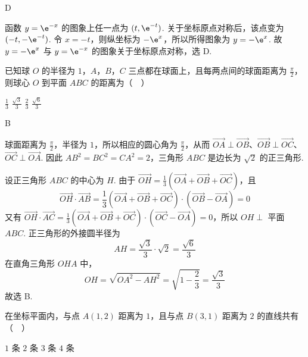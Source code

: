 \begin{answer}
D
\end{answer}

\begin{solution}
函数 \(y=\e^{-x}\) 的图象上任一点为 \((t,\e^{-t})\). 关于坐标原点对称后，该点变为 \((-t,-\e^{-t})\). 令 \(x=-t\)，则纵坐标为 \(-\e^x\)，所以所得图象为 \(y=-\e^x\). 故 \(y=-\e^x\) 与 \(y=\e^{-x}\) 的图象关于坐标原点对称，选 D.
\end{solution}

\begin{problem}
已知球 \(O\) 的半径为 \(1\)，\(A\)，\(B\)，\(C\) 三点都在球面上，且每两点间的球面距离为 \(\frac{\pi}{2}\)，则球心 \(O\) 到平面 \(ABC\) 的距离为（\(\quad\)）

\choices
    {\(\frac{1}{3}\)}
    {\(\frac{\sqrt{3}}{3}\)}
    {\(\frac{2}{3}\)}
    {\(\frac{\sqrt{6}}{3}\)}
\end{problem}

\begin{answer}
B
\end{answer}

\begin{solution}
球面距离为 \(\frac\pi2\)，半径为 \(1\)，所以相应的圆心角为 \(\frac\pi2\)，从而
\(\overrightarrow{OA}\perp\overrightarrow{OB}\)、\(\overrightarrow{OB}\perp\overrightarrow{OC}\)、\(\overrightarrow{OC}\perp\overrightarrow{OA}\). 因此
\(AB^2=BC^2=CA^2=2\)，三角形 \(ABC\) 是边长为 \(\sqrt2\) 的正三角形.

设正三角形 \(ABC\) 的中心为 \(H\). 由于
\(\overrightarrow{OH}=\frac13(\overrightarrow{OA}+\overrightarrow{OB}+\overrightarrow{OC})\)，且
\[
\overrightarrow{OH}\cdot\overrightarrow{AB}
=\frac13(\overrightarrow{OA}+\overrightarrow{OB}+\overrightarrow{OC})\cdot(\overrightarrow{OB}-\overrightarrow{OA})=0
\]
又有
\(\overrightarrow{OH}\cdot\overrightarrow{AC}=\frac13(\overrightarrow{OA}+\overrightarrow{OB}+\overrightarrow{OC})\cdot(\overrightarrow{OC}-\overrightarrow{OA})=0\)，所以 \(OH\perp\) 平面 \(ABC\). 正三角形的外接圆半径为
\[
AH=\frac{\sqrt3}{3}\cdot\sqrt2=\frac{\sqrt6}{3}
\]
在直角三角形 \(OHA\) 中，
\[
OH=\sqrt{OA^2-AH^2}=\sqrt{1-\frac23}=\frac{\sqrt3}{3}
\]
故选 B.
\end{solution}

\begin{problem}
在坐标平面内，与点 \(A(1,2)\) 距离为 \(1\)，且与点 \(B(3,1)\) 距离为 \(2\) 的直线共有（\(\quad\)）

\choices
    {\(1\text{ 条}\)}
    {\(2\text{ 条}\)}
    {\(3\text{ 条}\)}
    {\(4\text{ 条}\)}
\end{problem}

